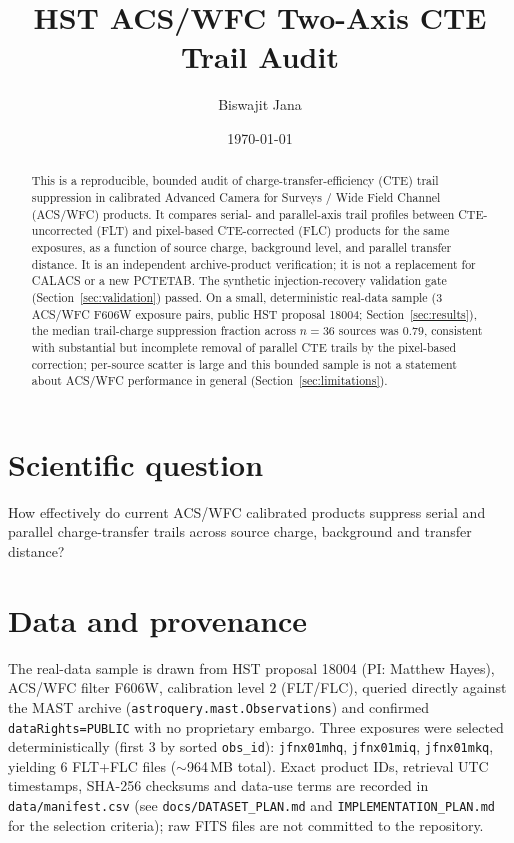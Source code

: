 \documentclass[11pt]{article}
\title{HST ACS/WFC Two-Axis CTE Trail Audit}
\author{Biswajit Jana}
\date{\today}
\begin{document}
\maketitle

\begin{abstract}
This is a reproducible, bounded audit of charge-transfer-efficiency (CTE) trail
suppression in calibrated Advanced Camera for Surveys / Wide Field Channel
(ACS/WFC) products. It compares serial- and parallel-axis trail profiles
between CTE-uncorrected (FLT) and pixel-based CTE-corrected (FLC) products for
the same exposures, as a function of source charge, background level, and
parallel transfer distance. It is an independent archive-product verification;
it is not a replacement for CALACS or a new PCTETAB. The synthetic
injection-recovery validation gate (Section~\ref{sec:validation}) passed. On a
small, deterministic real-data sample (3 ACS/WFC F606W exposure pairs, public
HST proposal 18004; Section~\ref{sec:results}), the median trail-charge
suppression fraction across $n=36$ sources was $0.79$, consistent with
substantial but incomplete removal of parallel CTE trails by the pixel-based
correction; per-source scatter is large and this bounded sample is not a
statement about ACS/WFC performance in general (Section~\ref{sec:limitations}).
\end{abstract}

\section{Scientific question}
How effectively do current ACS/WFC calibrated products suppress serial and
parallel charge-transfer trails across source charge, background and
transfer distance?

\section{Data and provenance}
\label{sec:data}
The real-data sample is drawn from HST proposal 18004 (PI: Matthew Hayes),
ACS/WFC filter F606W, calibration level 2 (FLT/FLC), queried directly against
the MAST archive (\texttt{astroquery.mast.Observations}) and confirmed
\texttt{dataRights=PUBLIC} with no proprietary embargo. Three exposures were
selected deterministically (first 3 by sorted \texttt{obs\_id}):
\texttt{jfnx01mhq}, \texttt{jfnx01miq}, \texttt{jfnx01mkq}, yielding 6
FLT+FLC files ($\sim$964\,MB total). Exact product IDs, retrieval UTC
timestamps, SHA-256 checksums and data-use terms are recorded in
\texttt{data/manifest.csv} (see \texttt{docs/DATASET\_PLAN.md} and
\texttt{IMPLEMENTATION\_PLAN.md} for the selection criteria); raw FITS files
are not committed to the repository.
\end{document}

